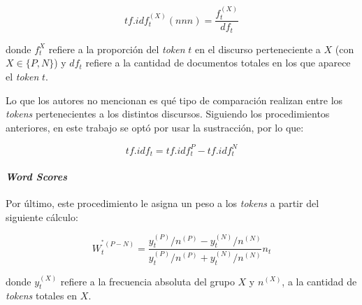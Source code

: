 \begin{equation}
\label{equation-tfidf-nnn}
    tf.idf_{t}^{(X)}(nnn) = \frac{f_{t}^{(X)}}{df_{t}}
\end{equation}

donde $f_{t}^{X}$ refiere a la proporci\'on del \textit{token} $t$
en el discurso perteneciente a $X$
(con $X \in \lbrace P,N \rbrace$) y $df_t$ refiere a la cantidad
de documentos totales en los que aparece el \textit{token} $t$.
\par
Lo que los autores no mencionan es qu\'e tipo de comparaci\'on realizan
entre los \textit{tokens} pertenecientes a los distintos discursos.
Siguiendo los procedimientos anteriores, en este trabajo se opt\'o por usar
la sustracci\'on, por lo que:

\begin{equation*}
    tf.idf_{t} = tf.idf_{t}^{P}-tf.idf_{t}^{N}
\end{equation*}

\paragraph{\textit{Word Scores}}
\label{paragraph-methods-wordscores}
Por \'ultimo, este procedimiento le asigna un peso a los \textit{tokens}
a partir del siguiente c\'alculo:

\begin{equation*}
    W_{t}^{^*(P-N)} = \frac{
        y_{t}^{(P)}/n^{(P)}-y_{t}^{(N)}/n^{(N)}
        }{
            y_{t}^{(P)}/n^{(P)}+y_{t}^{(N)}/n^{(N)}
        }n_{t}
\end{equation*}

donde $y_{t}^{(X)}$ refiere a la frecuencia absoluta
del grupo $X$ y $n^{(X)}$, a la cantidad de \textit{tokens} totales en $X$.

